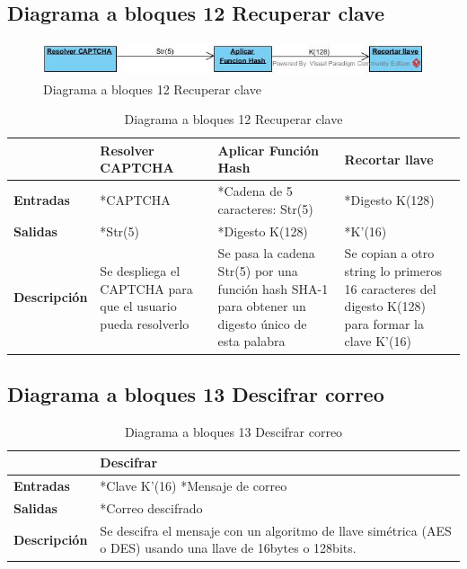 \subsection{Diagrama a bloques 12 Recuperar clave}
\begin{figure}[H]
	\includegraphics[width=1\linewidth, height=1cm]{./images/bloques12.jpg}
	\caption{Diagrama a bloques 12 Recuperar clave}
	\label{fig:5-12-1}
\end{figure}
\begin{table}[H]
 \centering
   {
     \begin{tabular}{| p{} | p{3cm} | p{3cm} | p{3cm} |}
     \hline
     & \textbf{Resolver CAPTCHA} & \textbf{Aplicar Función Hash} & \textbf{Recortar llave}\\
     \hline
     \textbf{Entradas} & *CAPTCHA & *Cadena de 5 caracteres: Str(5) & *Digesto K(128)\\
     \hline
     \textbf{Salidas} & *Str(5) & *Digesto K(128) & *K’(16)\\
     \hline
     \textbf{Descripción} & Se despliega el CAPTCHA para que el usuario pueda resolverlo & Se pasa la cadena Str(5) por una función hash SHA-1 para obtener un digesto único de esta palabra & Se copian a otro string lo primeros 16 caracteres del digesto K(128) para formar la clave K’(16)\\
	\hline
    \end{tabular}
    }
    \caption{Diagrama a bloques 12 Recuperar clave}
    \label{tabla:b12}
\end{table}

\subsection{Diagrama a bloques 13 Descifrar correo}
\begin{table}[H]
 \centering
   {
     \begin{tabular}{| p{} | p{3cm} |}
     \hline
     & \textbf{Descifrar}\\
     \hline
     \textbf{Entradas} & *Clave K’(16) *Mensaje de correo\\
     \hline
     \textbf{Salidas} & *Correo descifrado\\
     \hline
     \textbf{Descripción} & Se descifra el mensaje con un algoritmo de llave simétrica (AES o DES) usando una llave de 16bytes o 128bits.\\
	\hline
    \end{tabular}
    }
    \caption{Diagrama a bloques 13 Descifrar correo}
    \label{tabla:b13}
\end{table}